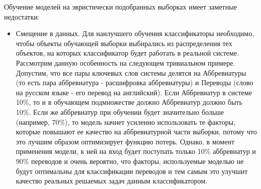 Обучение моделей на эвристически подобранных выборках имеет заметные недостатки:

\begin{itemize}
    \item Смещение в данных. Для наилучшего обучения классификаторы необходимо, чтобы объекты обучающей выборки выбирались из распределения тех объектов, на которых классификатор будет работать в реальной системе. Рассмотрим данную особенность на следующем тривиальном примере. Допустим, что все пары ключевых слов системы делятся на Аббревиатуры (то есть пара аббревиатура - расшифровка аббревиатуры) и Переводы (слово на русском языке - его перевод на английский). Если Аббревиатур в системе 10\%, то и в обучающем подмножестве должно Аббревиатур должно быть 10\%. Если же аббревиатур при обучении будет значительно больше (например, 70\%), то модель начнет усиленно использовать те факторы, которые повышают ее качество на аббревиатурной части выборки, потому что это лучшим образом оптимизирует функцию потерь. Однако, в момент применения модели, к ней на вход будет поступать только 10\% аббревиатур и 90\% переводов и очень вероятно, что факторы, используемые моделью не будут оптимальны для классификации переводов и тем самым это улучшит качество реальных решаемых задач данным классификатором.  


\end{itemize}
